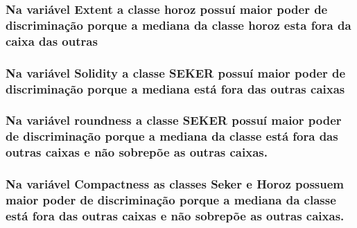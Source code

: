 \documentclass[
]{article}
\begin{document}
\hypertarget{na-variuxe1vel-extent-a-classe-horoz-possuuxed-maior-poder-de-discriminauxe7uxe3o-porque-a-mediana-da-classe-horoz-esta-fora-da-caixa-das-outras}{%
\subsubsection{Na variável Extent a classe horoz possuí maior poder de
discriminação porque a mediana da classe horoz esta fora da caixa das
outras}\label{na-variuxe1vel-extent-a-classe-horoz-possuuxed-maior-poder-de-discriminauxe7uxe3o-porque-a-mediana-da-classe-horoz-esta-fora-da-caixa-das-outras}}

\hypertarget{na-variuxe1vel-solidity-a-classe-seker-possuuxed-maior-poder-de-discriminauxe7uxe3o-porque-a-mediana-estuxe1-fora-das-outras-caixas}{%
\subsubsection{Na variável Solidity a classe SEKER possuí maior poder de
discriminação porque a mediana está fora das outras
caixas}\label{na-variuxe1vel-solidity-a-classe-seker-possuuxed-maior-poder-de-discriminauxe7uxe3o-porque-a-mediana-estuxe1-fora-das-outras-caixas}}

\hypertarget{na-variuxe1vel-roundness-a-classe-seker-possuuxed-maior-poder-de-discriminauxe7uxe3o-porque-a-mediana-da-classe-estuxe1-fora-das-outras-caixas-e-nuxe3o-sobrepuxf5e-as-outras-caixas.}{%
\subsubsection{Na variável roundness a classe SEKER possuí maior poder
de discriminação porque a mediana da classe está fora das outras caixas
e não sobrepõe as outras
caixas.}\label{na-variuxe1vel-roundness-a-classe-seker-possuuxed-maior-poder-de-discriminauxe7uxe3o-porque-a-mediana-da-classe-estuxe1-fora-das-outras-caixas-e-nuxe3o-sobrepuxf5e-as-outras-caixas.}}

\hypertarget{na-variuxe1vel-compactness-as-classes-seker-e-horoz-possuem-maior-poder-de-discriminauxe7uxe3o-porque-a-mediana-da-classe-estuxe1-fora-das-outras-caixas-e-nuxe3o-sobrepuxf5e-as-outras-caixas.}{%
\subsubsection{Na variável Compactness as classes Seker e Horoz possuem
maior poder de discriminação porque a mediana da classe está fora das
outras caixas e não sobrepõe as outras
caixas.}\label{na-variuxe1vel-compactness-as-classes-seker-e-horoz-possuem-maior-poder-de-discriminauxe7uxe3o-porque-a-mediana-da-classe-estuxe1-fora-das-outras-caixas-e-nuxe3o-sobrepuxf5e-as-outras-caixas.}}
\end{document}
